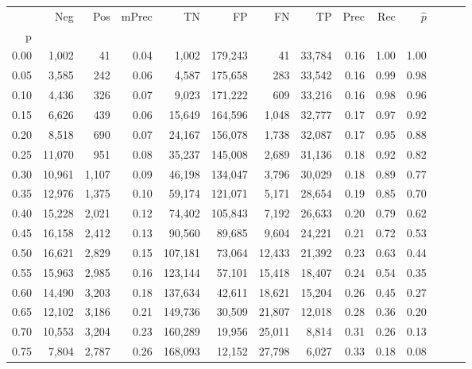 \begin{tabular}{rrrrrrrrrrrrrr}
\toprule
{} &     Neg &    Pos & mPrec &       TN &       FP &      FN &      TP &  Prec &   Rec & $\hat{p}$ \\
p    &         &        &       &          &          &         &         &       &       &           \\
\midrule
0.00 &   1,002 &     41 &  0.04 &    1,002 &  179,243 &      41 &  33,784 &  0.16 &  1.00 &      1.00 \\
0.05 &   3,585 &    242 &  0.06 &    4,587 &  175,658 &     283 &  33,542 &  0.16 &  0.99 &      0.98 \\
0.10 &   4,436 &    326 &  0.07 &    9,023 &  171,222 &     609 &  33,216 &  0.16 &  0.98 &      0.96 \\
0.15 &   6,626 &    439 &  0.06 &   15,649 &  164,596 &   1,048 &  32,777 &  0.17 &  0.97 &      0.92 \\
0.20 &   8,518 &    690 &  0.07 &   24,167 &  156,078 &   1,738 &  32,087 &  0.17 &  0.95 &      0.88 \\
0.25 &  11,070 &    951 &  0.08 &   35,237 &  145,008 &   2,689 &  31,136 &  0.18 &  0.92 &      0.82 \\
0.30 &  10,961 &  1,107 &  0.09 &   46,198 &  134,047 &   3,796 &  30,029 &  0.18 &  0.89 &      0.77 \\
0.35 &  12,976 &  1,375 &  0.10 &   59,174 &  121,071 &   5,171 &  28,654 &  0.19 &  0.85 &      0.70 \\
0.40 &  15,228 &  2,021 &  0.12 &   74,402 &  105,843 &   7,192 &  26,633 &  0.20 &  0.79 &      0.62 \\
0.45 &  16,158 &  2,412 &  0.13 &   90,560 &   89,685 &   9,604 &  24,221 &  0.21 &  0.72 &      0.53 \\
0.50 &  16,621 &  2,829 &  0.15 &  107,181 &   73,064 &  12,433 &  21,392 &  0.23 &  0.63 &      0.44 \\
0.55 &  15,963 &  2,985 &  0.16 &  123,144 &   57,101 &  15,418 &  18,407 &  0.24 &  0.54 &      0.35 \\
0.60 &  14,490 &  3,203 &  0.18 &  137,634 &   42,611 &  18,621 &  15,204 &  0.26 &  0.45 &      0.27 \\
0.65 &  12,102 &  3,186 &  0.21 &  149,736 &   30,509 &  21,807 &  12,018 &  0.28 &  0.36 &      0.20 \\
0.70 &  10,553 &  3,204 &  0.23 &  160,289 &   19,956 &  25,011 &   8,814 &  0.31 &  0.26 &      0.13 \\
0.75 &   7,804 &  2,787 &  0.26 &  168,093 &   12,152 &  27,798 &   6,027 &  0.33 &  0.18 &      0.08 \\

\end{tabular}
